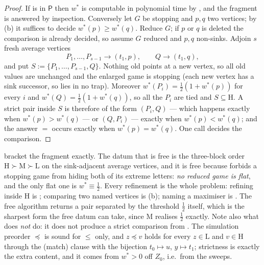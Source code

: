 \begin{proof}
If  is in $\mathsf P$ then $w^\ast$ is computable in polynomial
time by , and the fragment is answered by
inspection. Conversely let $G$ be stopping and $p,q$ two vertices; by
(b) it suffices to decide
$w^\ast(p)\ge w^\ast(q)$. Reduce $G$; if $p$ or $q$ is deleted the comparison
is already decided, so assume $G$ reduced and $p,q$ non-sinks. Adjoin $s$ fresh
average vertices
\[
  P_1,\dots,P_{s-1}\to(t_1,p),\qquad Q\to(t_1,q),
\]
and put $S:=\{P_1,\dots,P_{s-1},Q\}$. Nothing old points at a new vertex, so
all old values are unchanged and the enlarged game is stopping (each new vertex
has a sink successor, so lies in no trap). Moreover
$w^\ast(P_i)=\tfrac12(1+w^\ast(p))$ for every $i$ and
$w^\ast(Q)=\tfrac12(1+w^\ast(q))$, so all the $P_i$ are tied and
$S\subseteq\mathrm H$. A strict pair inside $S$ is therefore of the form
$(P_i,Q)$ --- which happens exactly when $w^\ast(p)>w^\ast(q)$ --- or $(Q,P_i)$
--- exactly when $w^\ast(p)<w^\ast(q)$; and the answer $=$ occurs exactly when
$w^\ast(p)=w^\ast(q)$. One call decides the comparison.
\end{proof}

\begin{remark}\label{rem:wo-boundary}
 bracket the fragment exactly. The datum
that is free is the three-block order $\mathrm H\succ\mathrm M\succ\mathrm L$
on the sink-adjacent average vertices, and it is free because
 forbids a stopping game from hiding both of its extreme
letters: \emph{no reduced game is flat}, and the only flat one is
$w^\ast\equiv\tfrac12$. Every refinement is the whole problem: refining inside
$\mathrm H$ is ; comparing two named vertices is
(b); naming a maximiser is . The free
algorithm returns a pair separated by the threshold $\tfrac12$ itself, which is
the sharpest form the free datum can take, since $\mathrm M$ realises
$\tfrac12$ exactly. Note also what  does \emph{not} do:
it does not produce a strict comparison from . The
simulation preorder $\preceq$ is sound for $\le$ only, and $z\preceq v$ holds
for every $z\in\mathrm L$ and $v\in\mathrm H$ through the (match) clause with
the bijection $t_0\mapsto u$, $y\mapsto t_1$; strictness is exactly the extra
content, and it comes from $w^\ast>0$ off $Z_0$, i.e.\ from the sweeps.
\end{remark}

